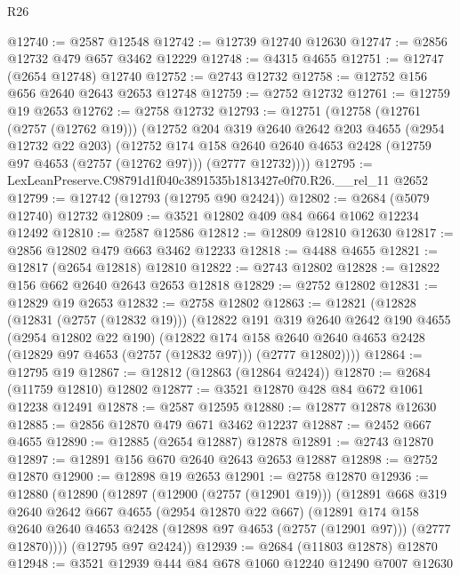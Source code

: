 \begin{lexlean}{R26}
\begin{coremodule}
@12740 := @2587 @12548
@12742 := @12739 @12740 @12630
@12747 := @2856 @12732 @479 @657 @3462 @12229
@12748 := @4315 @4655
@12751 := @12747 (@2654 @12748) @12740
@12752 := @2743 @12732
@12758 := @12752 @156 @656 @2640 @2643 @2653 @12748
@12759 := @2752 @12732
@12761 := @12759 @19 @2653
@12762 := @2758 @12732
@12793 := @12751
    (@12758
      (@12761 (@2757 (@12762 @19)))
      (@12752
        @204
        @319
        @2640
        @2642
        @203
        @4655
        (@2954 @12732 @22 @203)
        (@12752
          @174
          @158
          @2640
          @2640
          @4653
          @2428
          (@12759 @97 @4653 (@2757 (@12762 @97)))
          (@2777 @12732))))
@12795 := LexLeanPreserve.C98791d1f040c3891535b1813427e0f70.R26.__rel_11 @2652
@12799 := @12742 (@12793 (@12795 @90 @2424))
@12802 := @2684 (@5079 @12740) @12732
@12809 := @3521 @12802 @409 @84 @664 @1062 @12234 @12492
@12810 := @2587 @12586
@12812 := @12809 @12810 @12630
@12817 := @2856 @12802 @479 @663 @3462 @12233
@12818 := @4488 @4655
@12821 := @12817 (@2654 @12818) @12810
@12822 := @2743 @12802
@12828 := @12822 @156 @662 @2640 @2643 @2653 @12818
@12829 := @2752 @12802
@12831 := @12829 @19 @2653
@12832 := @2758 @12802
@12863 := @12821
    (@12828
      (@12831 (@2757 (@12832 @19)))
      (@12822
        @191
        @319
        @2640
        @2642
        @190
        @4655
        (@2954 @12802 @22 @190)
        (@12822
          @174
          @158
          @2640
          @2640
          @4653
          @2428
          (@12829 @97 @4653 (@2757 (@12832 @97)))
          (@2777 @12802))))
@12864 := @12795 @19
@12867 := @12812 (@12863 (@12864 @2424))
@12870 := @2684 (@11759 @12810) @12802
@12877 := @3521 @12870 @428 @84 @672 @1061 @12238 @12491
@12878 := @2587 @12595
@12880 := @12877 @12878 @12630
@12885 := @2856 @12870 @479 @671 @3462 @12237
@12887 := @2452 @667 @4655
@12890 := @12885 (@2654 @12887) @12878
@12891 := @2743 @12870
@12897 := @12891 @156 @670 @2640 @2643 @2653 @12887
@12898 := @2752 @12870
@12900 := @12898 @19 @2653
@12901 := @2758 @12870
@12936 := @12880
    (@12890
      (@12897
        (@12900 (@2757 (@12901 @19)))
        (@12891
          @668
          @319
          @2640
          @2642
          @667
          @4655
          (@2954 @12870 @22 @667)
          (@12891
            @174
            @158
            @2640
            @2640
            @4653
            @2428
            (@12898 @97 @4653 (@2757 (@12901 @97)))
            (@2777 @12870))))
      (@12795 @97 @2424))
@12939 := @2684 (@11803 @12878) @12870
@12948 := @3521 @12939 @444 @84 @678 @1060 @12240 @12490 @7007 @12630

\end{coremodule}
\end{lexlean}
